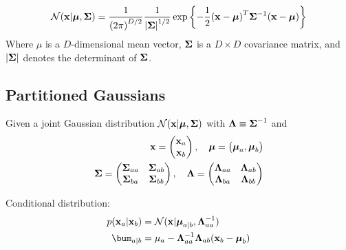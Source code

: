 \begin{equation}
    \mathcal{N}(\mathbf{x}|\boldsymbol\mu, \boldsymbol\Sigma) = \frac{1}{{(2\pi)}^{D/2}}
    \frac{1}{{|\boldsymbol\Sigma|}^{1/2}} \exp\left\{ -\frac{1}{2} {(\mathbf{x} -
    \boldsymbol\mu)}^T\boldsymbol\Sigma^{-1}(\mathbf{x} - \boldsymbol\mu) \right\} 
    \label{gaussian}
\end{equation}
Where $\mu$ is a $D$-dimensional mean vector, $\boldsymbol\Sigma$ is a $D \times D$
covariance matrix, and $|\boldsymbol\Sigma|$ denotes the determinant of $\boldsymbol\Sigma$.

\subsection{Partitioned Gaussians}
Given a joint Gaussian distribution $\mathcal{N}(\mathbf{x}|\boldsymbol\mu, \boldsymbol\Sigma)$ with
$\boldsymbol\Lambda \equiv \boldsymbol\Sigma^{-1}$ and 
\begin{align}
    \mathbf{x} = \begin{pmatrix}\mathbf{x}_a \\ \mathbf{x}_b \end{pmatrix}, \quad \boldsymbol\mu =
    \begin{pmatrix}\boldsymbol\mu_a, \boldsymbol\mu_b
    \end{pmatrix} \\
    \boldsymbol\Sigma = \begin{pmatrix}\boldsymbol\Sigma_{aa} & \boldsymbol\Sigma_{ab} \\ \boldsymbol\Sigma_{ba} &
        \boldsymbol\Sigma_{bb} \end{pmatrix} , \quad 
    \boldsymbol\Lambda = \begin{pmatrix} \boldsymbol\Lambda_{aa} & \boldsymbol\Lambda_{ab} \\ \boldsymbol\Lambda_{ba} &
        \boldsymbol\Lambda_{bb} \end{pmatrix}
\end{align}

Conditional distribution:
\begin{align}
    p(\bx_a|\bx_b) &= \mathcal{N}(\bx|\bmu_{a|b}, \bLam^{-1}_{aa}) \\
    \bum_{a|b} &= \mu_a - \bLam^{-1}_{aa}\bLam_{ab}(\bx_b -
    \bmu_{b})
\end{align}


